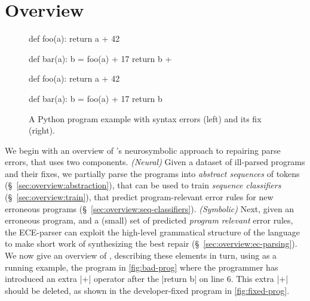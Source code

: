 \section{Overview}
\label{sec:overview}

\begin{figure}[t]
\centering
\begin{minipage}[c]{0.48\linewidth}
\begin{ecode}
def foo(a):
  return a + 42

def bar(a):
  b = foo(a) + 17
  return b +
\end{ecode}
\label{fig:bad-prog}
\end{minipage}%
\hspace{0.02\linewidth}%
\begin{minipage}[c]{0.48\linewidth}
\begin{ecode}
def foo(a):
  return a + 42

def bar(a):
  b = foo(a) + 17
  return b
\end{ecode}
\label{fig:fixed-prog}
\end{minipage}
\caption{A Python program example with syntax errors (left) and its fix (right).}
\label{fig:example-prog}
\end{figure}

We begin with an overview of \toolname's neurosymbolic
approach to repairing parse errors, that uses two components.
%
\emph{(Neural)}
%
Given a dataset of ill-parsed programs and
their fixes, we partially parse the programs
into \emph{abstract sequences} of tokens
(\S~\ref{sec:overview:abstraction}), that can
be used to train \emph{sequence classifiers}
(\S~\ref{sec:overview:train}), that predict
program-relevant error rules for new erroneous
programs (\S~\ref{sec:overview:seq-classifiers}).
%
\emph{(Symbolic)}
%
Next, given an erroneous program, and a (small) set of predicted \emph{program
relevant} error rules, the ECE-parser can exploit the high-level grammatical
structure of the language to make short work of synthesizing the best repair
(\S~\ref{sec:overview:ec-parsing}).
%
We now give an overview of \toolname, describing these
elements in turn,  using as a running example, the program
in \autoref{fig:bad-prog} where the programmer has introduced
an extra |+| operator after the |return b| on line 6.
%
This extra |+| should be deleted, as shown in the
developer-fixed program in \autoref{fig:fixed-prog}.

